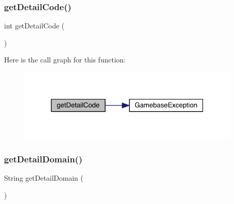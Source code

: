 \subsubsection{\texorpdfstring{get\+Detail\+Code()}{getDetailCode()}}
{\footnotesize\ttfamily int get\+Detail\+Code (\begin{DoxyParamCaption}{ }\end{DoxyParamCaption})}

Here is the call graph for this function\+:
\nopagebreak
\begin{figure}[H]
\begin{center}
\leavevmode
\includegraphics[width=304pt]{classcom_1_1toast_1_1android_1_1gamebase_1_1base_1_1_gamebase_exception_a92a64f56cf7dcfbe8f00fc7cb21d3ca6_cgraph}
\end{center}
\end{figure}
\mbox{\label{classcom_1_1toast_1_1android_1_1gamebase_1_1base_1_1_gamebase_exception_ab0c945b0986046152a180b912283119c}} 
\subsubsection{\texorpdfstring{get\+Detail\+Domain()}{getDetailDomain()}}
{\footnotesize\ttfamily String get\+Detail\+Domain (\begin{DoxyParamCaption}{ }\end{DoxyParamCaption})}

